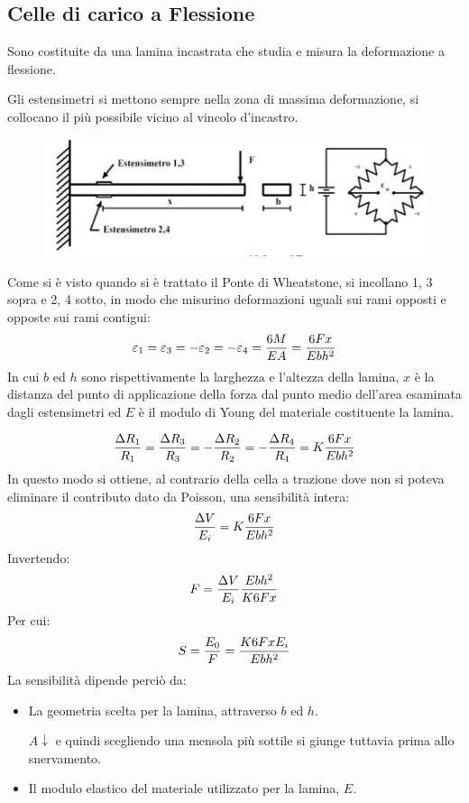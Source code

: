 \documentclass[a4paper, 15pt]{article}
\begin{document}
\subsection{Celle di carico a Flessione}		
\begin{adjustwidth}{2in}{}	
	 	Sono costituite da una lamina incastrata che studia e misura la deformazione a flessione. 
	 	
	 	Gli estensimetri si mettono sempre nella zona di massima deformazione, si collocano il più possibile vicino al vincolo d'incastro. 
\begin{figure}[H]
	\centering
	\includegraphics[width=0.5\linewidth]{immagini/13}
	\label{fig:13}
\end{figure}
	 	Come si è visto quando si è trattato il Ponte di Wheatstone, si incollano 1, 3 sopra e 2, 4 sotto, in modo che misurino deformazioni uguali sui rami opposti e opposte sui rami contigui:
	 	\[\varepsilon_1 = \varepsilon_3 = -\varepsilon_2 = -\varepsilon_4 = {6M\over EA} = {6Fx\over Ebh^2}\] 
	 	In cui $b$ ed $h$ sono rispettivamente la larghezza e l'altezza della lamina, $x$ è la distanza del punto di applicazione della forza dal punto medio dell'area
	 	esaminata dagli estensimetri ed $E$ è il modulo di Young del materiale costituente la lamina. 
	 	
	 	\[{\Delta R_1\over R_1} = {\Delta R_3\over R_3} = -{\Delta R_2\over R_2} = -{\Delta R_4\over R_4} = K{6Fx\over Ebh^2}\]
	 	In questo modo si ottiene, al contrario della cella a trazione dove non si poteva eliminare il contributo dato da Poisson, una sensibilità intera: 
	 	\[{\Delta V\over E_i} = K{6Fx\over Ebh^2}\]
	 	Invertendo: 
	 	\[ F = {\Delta V\over E_i}{Ebh^2\over K6Fx}\]
	 	Per cui: 
	 	\[S = {E_0\over F} = {K6FxE_i\over Ebh^2} \]
\newpage
	 	La sensibilità dipende perciò da:
	 	\begin{itemize}
	 		\item La geometria scelta per la lamina, attraverso $b$ ed $ h $. 
	 		
	 		$A\downarrow$ e quindi scegliendo una mensola più sottile si giunge tuttavia prima allo snervamento. 
	 		
	 		\item Il modulo elastico del materiale utilizzato per la lamina, $ E $.
	 		

\end{itemize}
\end{adjustwidth}
\end{document}

